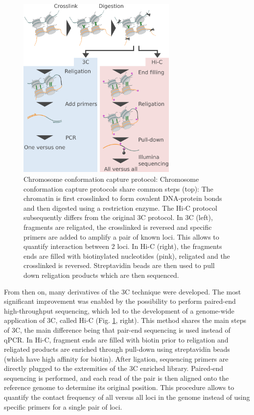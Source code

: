 \begin{figure}[htb]
    \centering
    \includegraphics[width=0.7\textwidth]{Parts/Part01/gfx/3c_protocol.pdf}
    \caption[Chromosome conformation capture protocol.]{Chromosome conformation capture protocol: Chromosome conformation capture protocols share common steps (top): The chromatin is first crosslinked to form covalent DNA-protein bonds and then digested using a restriction enzyme. The Hi-C protocol subsequently differs from the original 3C protocol. In 3C (left), fragments are religated, the crosslinked is reversed and specific primers are added to amplify a pair of known loci. This allows to quantify interaction between 2 loci. In Hi-C (right), the fragments ends are filled with biotinylated nucleotides (pink), religated and the crosslinked is reversed. Streptavidin beads are then used to pull down religation products which are then sequenced.}
	\label{fig:01-02:3c}
\end{figure}

From then on, many derivatives of the \acrshort{3C} technique were developed. The most significant improvement was enabled by the possibility to perform paired-end high-throughput sequencing, which led to the development of a genome-wide application of 3C, called Hi-C (Fig. \ref{fig:01-02:3c}, right). This method shares the main steps of 3C, the main difference being that pair-end sequencing is used instead of qPCR. In Hi-C, fragment ends are filled with biotin prior to religation \cite{lieberman-aidenComprehensiveMappingLongRange2009} and religated products are enriched through pull-down using streptavidin beads (which have high affinity for biotin). After ligation, sequencing primers are directly plugged to the extremities of the 3C enriched library. Paired-end sequencing is performed, and each read of the pair is then aligned onto the reference genome to determine its original position. This procedure allows to quantify the contact frequency of all versus all loci in the genome instead of using specific primers for a single pair of loci. 

